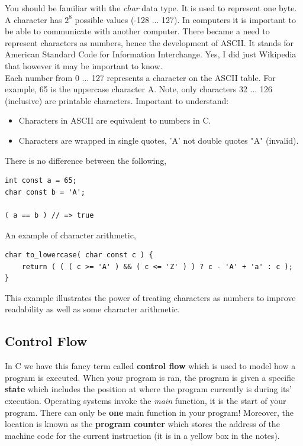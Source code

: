 \documentclass[12pt,extarticle]{article}
\begin{document}
You should be familiar with the \emph{char} data type. It is used to represent one byte. A character has $2^{8}$ possible values (-128 ... 127). In computers it is important to be able to communicate with another computer. There became a need to represent characters as numbers, hence the development of ASCII. It stands for American Standard Code for Information Interchange. Yes, I did just Wikipedia that however it may be important to know.\\

Each number from 0 ... 127 represents a character on the ASCII table. For example, 65 is the uppercase character A. Note, only characters 32 ... 126 (inclusive) are printable characters. Important to understand:

\begin{itemize}

\item Characters in ASCII are equivalent to numbers in C.
\item Characters are wrapped in single quotes, 'A' not double quotes "A" (invalid).

\end{itemize}

There is no difference between the following,\\

\lstset {
	language=c
}
\begin{lstlisting}
int const a = 65;
char const b = 'A';

( a == b ) // => true
\end{lstlisting}

An example of character arithmetic,\\

\lstset {
	language=c
}
\begin{lstlisting}
char to_lowercase( char const c ) {
	return ( ( ( c >= 'A' ) && ( c <= 'Z' ) ) ? c - 'A' + 'a' : c );
}
\end{lstlisting}

This example illustrates the power of treating characters as numbers to improve readability as well as some character arithmetic.

\subsection{Control Flow}

In C we have this fancy term called \textbf{control flow} which is used to model how a program is executed. When your program is ran, the program is given a specific \textbf{state} which includes the position at where the program currently is during its' execution. Operating systems invoke the \emph{main} function, it is the start of your program. There can only be \textbf{one} main function in your program! Moreover, the location is known as the \textbf{program counter} which stores the address of the machine code for the current instruction (it is in a yellow box in the notes).\\
\end{document}
